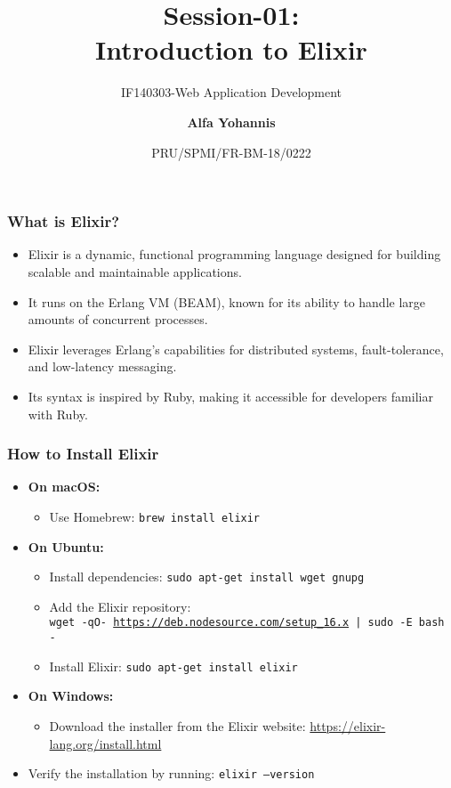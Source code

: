 \documentclass[aspectratio=169, table]{beamer}
\subtitle{IF140303-Web Application Development}
\title{\LARGE{Session-01:\\Introduction to Elixir}
	\vspace{20pt}}
\date[Serial]{\scriptsize {PRU/SPMI/FR-BM-18/0222}}
\author[Pradita]{\small{\textbf{Alfa Yohannis}}}
\begin{document}
	
	\frame{\titlepage}
	
	\begin{frame}
		\frametitle{What is Elixir?}
		\begin{itemize}
			\item Elixir is a dynamic, functional programming language designed for building scalable and maintainable applications.
			\item It runs on the Erlang VM (BEAM), known for its ability to handle large amounts of concurrent processes.
			\item Elixir leverages Erlang's capabilities for distributed systems, fault-tolerance, and low-latency messaging.
			\item Its syntax is inspired by Ruby, making it accessible for developers familiar with Ruby.
		\end{itemize}
	\end{frame}
	
	\begin{frame}
		\frametitle{How to Install Elixir}
		\vspace{20pt}
		\begin{itemize}
			\item \textbf{On macOS:}
			\begin{itemize}
				\item Use Homebrew: \texttt{brew install elixir}
			\end{itemize}
			\item \textbf{On Ubuntu:}
			\begin{itemize}
				\item Install dependencies: \texttt{sudo apt-get install wget gnupg}
				\item Add the Elixir repository:\\\texttt{wget -qO- \url{https://deb.nodesource.com/setup\_16.x} | sudo -E bash -}
				\item Install Elixir: \texttt{sudo apt-get install elixir}
			\end{itemize}
			\item \textbf{On Windows:}
			\begin{itemize}
				\item Download the installer from the Elixir website: \url{https://elixir-lang.org/install.html}
			\end{itemize}
			\item Verify the installation by running: \texttt{elixir --version}
		\end{itemize}
	\end{frame}
	
\end{document}
